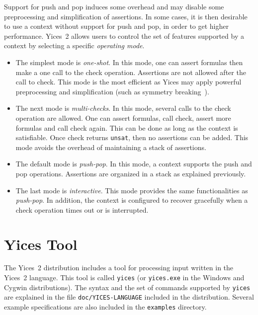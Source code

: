 \documentclass[11pt,twoside,fleqn,openright,titlepage]{cslreport}
\begin{document}
Support for  push and pop induces  some overhead and  may disable some
preprocessing and  simplification of assertions. In some  cases, it is
then desirable to  use a context without support for  push and pop, in
order to get  higher performance. Yices~2 allows users  to control the
set of  features supported by a  context by selecting  a specific {\em
  operating mode\/}.
\begin{itemize}
\item The simplest mode is {\em one-shot\/}. In this mode, one can
  assert formulas then make a one call to the check operation.
  Assertions are not allowed after the call to check. This mode is the
  most efficient as Yices may apply powerful preprocessing and
  simplification (such as symmetry breaking~\cite{Deharbe+etal:2011}).
\item The next mode is {\em multi-checks\/}. In this mode, several calls
  to the check operation are allowed. One can assert formulas, call
  check, assert more formulas and call check again. This can be done
  as long as the context is satisfiable. Once check returns
  \texttt{unsat}, then no assertions can be added. This mode avoids
  the overhead of maintaining a stack of assertions.
\item The default mode is {\em push-pop\/}. In this mode, a context
  supports the push and pop operations. Assertions are organized in a
  stack as explained previously.
\item The last mode is {\em interactive\/}. This mode provides the
  same functionalities as {\em push-pop\/}. In addition, the context
  is configured to recover gracefully when a check operation times out
  or is interrupted.
\end{itemize}



\chapter{Yices Tool}
\label{yices-shell}

The Yices~2 distribution includes  a tool for processing input written
in  the Yices~2  language.  This  tool is  called  \texttt{yices} (or
\texttt{yices.exe}  in  the Windows  and  Cygwin distributions).   The
syntax  and  the  set  of  commands supported  by  \texttt{yices}  are
explained  in  the file  \texttt{doc/YICES-LANGUAGE}  included in  the
distribution. Several example specifications  are also included in the
\texttt{examples} directory.
\end{document}
